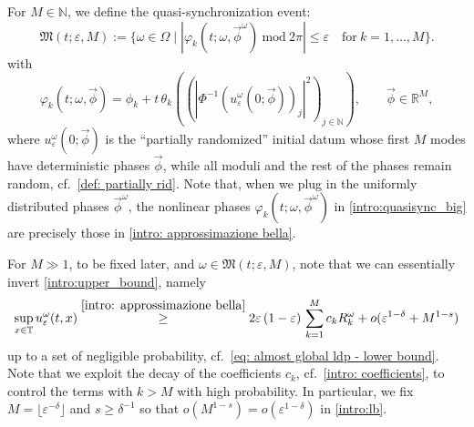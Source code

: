 \documentclass[a4paper,10pt,reqno]{article}
\theoremstyle{definition}
\theoremstyle{plain}
\theoremstyle{plain}
\theoremstyle{definition}
\theoremstyle{plain}
\theoremstyle{plain}
\theoremstyle{plain}
\theoremstyle{definition}
\theoremstyle{definition}
\def \N{\mathbb N}
\def \R{\mathbb R}
\def \T{\mathbb{T}}
\begin{document}
For %
$M\in\N$, we define the quasi-synchronization event:
\begin{equation}\label{intro:quasisync_big}
\mathfrak{M}(t;\varepsilon, M) := \{ \omega\in\mathbb{\Omega} \mid |\varphi_k (t; \omega, \vec{\phi}^{\omega}) \ \mbox{mod}\ 2\pi| \leq \varepsilon \quad \mbox{for}\ k=1,\ldots,M \}.
\end{equation}
with
\[
\varphi_k (t; \omega, \vec{\phi}) = \phi_k + t \,\theta_k \left( (|\Phi^{-1} (u_{\varepsilon}^{\omega}(0; \vec{\phi}))_j|^2)_{j\in\N}\right),\qquad \vec{\phi} \in \R^M,
\]
where $u_{\varepsilon}^{\omega}(0; \vec{\phi})$ is the ``partially randomized'' initial datum whose first $M$ modes have deterministic phases $\vec{\phi}$, while all moduli and the rest of the phases remain random, cf.~\eqref{def: partially rid}. Note that, when we plug in the uniformly distributed phases $\vec{\phi}^{\omega}$, the nonlinear phases $\varphi_k ( t; \omega, \vec{\phi}^{\omega})$ in \eqref{intro:quasisync_big} are precisely those in \eqref{intro: approssimazione bella}.

\smallskip

For $M\gg 1$, to be fixed later, and $\omega \in \mathfrak{M}(t;\varepsilon ,M)$, note that we can essentially invert \eqref{intro:upper_bound}, namely
\begin{equation}\label{intro:lb}
\sup_{x\in\T} u^{\omega}_{\varepsilon}(t,x) \stackrel{\eqref{intro: approssimazione bella}}{\geq} 2\varepsilon\, (1-\varepsilon )\,\sum_{k=1}^{M} c_k R_k^{\omega} + o(\varepsilon^{1-\delta}+ M^{1-s})
\end{equation}
up to a set of negligible probability, cf.~\eqref{eq: almost global ldp - lower bound}. Note that we exploit the decay of the coefficients $c_k$, cf.~\eqref{intro: coefficients}, to control the terms with $k>M$ with high probability. In particular, we fix $M=\lfloor \varepsilon^{-\delta} \rfloor$ and $s\geq \delta^{-1}$ so that $o(M^{1-s})=o(\varepsilon^{1-\delta})$ in \eqref{intro:lb}.

\smallskip
\end{document}
